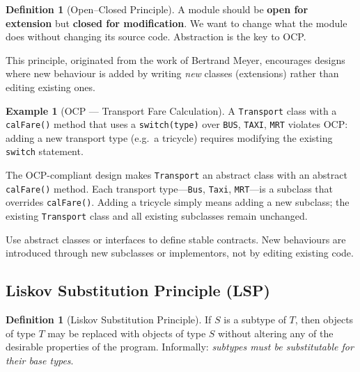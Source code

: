 \documentclass[11pt, a4paper, notitlepage]{report}
\theoremstyle{definition}
\newtheorem{definition}[theorem]{Definition}
\theoremstyle{remark}
\theoremstyle{definition}
\newtheorem{example}[theorem]{Example}
\begin{document}
\begin{definition}[Open--Closed Principle]
\label{def:ch9-ocp}
A module should be \textbf{open for extension} but \textbf{closed for modification}.
We want to change what the module does without changing its source code. Abstraction
is the key to OCP.
\end{definition}

This principle, originated from the work of Bertrand Meyer, encourages designs where
new behaviour is added by writing \emph{new} classes (extensions) rather than editing
existing ones.

\begin{example}[OCP --- Transport Fare Calculation]
\label{ex:ch9-ocp-transport}
A \texttt{Transport} class with a \texttt{calFare()} method that uses a
\texttt{switch(type)} over \texttt{BUS}, \texttt{TAXI}, \texttt{MRT} violates OCP:
adding a new transport type (e.g.\ a tricycle) requires modifying the existing
\texttt{switch} statement.

The OCP-compliant design makes \texttt{Transport} an abstract class with an abstract
\texttt{calFare()} method. Each transport type---\texttt{Bus}, \texttt{Taxi},
\texttt{MRT}---is a subclass that overrides \texttt{calFare()}. Adding a tricycle
simply means adding a new subclass; the existing \texttt{Transport} class and all
existing subclasses remain unchanged.
\end{example}

\begin{keyresult}[title={Key Result: Abstraction Enables OCP}]
  Use abstract classes or interfaces to define stable contracts. New behaviours are
  introduced through new subclasses or implementors, not by editing existing code.
\end{keyresult}

\subsection{Liskov Substitution Principle (LSP)}
\label{subsec:ch9-lsp}

\begin{definition}[Liskov Substitution Principle]
\label{def:ch9-lsp}
If $S$ is a subtype of $T$, then objects of type $T$ may be replaced with objects of
type $S$ without altering any of the desirable properties of the program. Informally:
\emph{subtypes must be substitutable for their base types}.
\end{definition}
\end{document}
